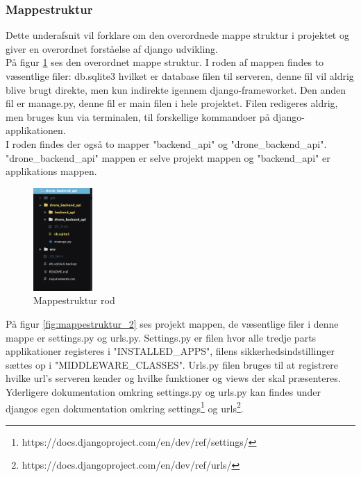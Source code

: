 \subsubsection*{Mappestruktur}
Dette underafsnit vil forklare om den overordnede mappe struktur i projektet og giver en overordnet forståelse af django udvikling. \\

På figur \ref{fig:mappestruktur_1} ses den overordnet mappe struktur. I roden af mappen findes to væsentlige filer: db.sqlite3 hvilket er database filen til serveren, denne fil vil aldrig blive brugt direkte, men kun indirekte igennem django-frameworket. Den anden fil er manage.py, denne fil er main filen i hele projektet. Filen redigeres aldrig, men bruges kun via terminalen, til forskellige kommandoer på django-applikationen. \\

I roden findes der også to mapper "backend\_api" og "drone\_backend\_api". "drone\_backend\_api"  mappen er selve projekt mappen og "backend\_api" er applikations mappen.

\begin{figure}[H]
	\centering
	\includegraphics[width=0.2\textwidth]{Billeder/implementation/mappestruktur_1.png}
	\caption{Mappestruktur rod}
	\label{fig:mappestruktur_1}
\end{figure}

På figur \ref{fig:mappestruktur_2} ses projekt mappen, de væsentlige filer i denne mappe er settings.py og urls.py.
Settings.py er filen hvor alle tredje parts applikationer registeres i "INSTALLED\_APPS", filens sikkerhedsindstillinger  sættes op i "MIDDLEWARE\_CLASSES". 
Urls.py filen bruges til at registrere hvilke url's serveren kender og hvilke funktioner og views der skal præsenteres. Yderligere dokumentation omkring settings.py og urls.py kan findes under djangos egen dokumentation omkring settings\footnote{https://docs.djangoproject.com/en/dev/ref/settings/} og urls\footnote{https://docs.djangoproject.com/en/dev/ref/urls/}.

